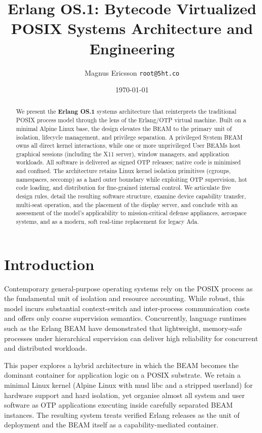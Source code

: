 \documentclass{article}
\title{Erlang OS.1: Bytecode Virtualized POSIX Systems Architecture and Engineering}
\author{Magnus Ericsson \texttt{root@5ht.co}}
\date{\today}
\begin{document}
\maketitle

\begin{abstract}
We present the \textbf{Erlang OS.1} systems architecture that reinterprets the traditional POSIX process model through the lens of the Erlang/OTP virtual machine.
Built on a minimal Alpine Linux base, the design elevates the BEAM to the primary unit of isolation, lifecycle management, and privilege separation.
A privileged System BEAM owns all direct kernel interactions, while one or more unprivileged User BEAMs host graphical sessions (including the X11 server), window managers, and application workloads.
All software is delivered as signed OTP releases; native code is minimised and confined.
The architecture retains Linux kernel isolation primitives (cgroups, namespaces, seccomp) as a hard outer boundary while exploiting OTP supervision, hot code loading, and distribution for fine-grained internal control.
We articulate five design rules, detail the resulting software structure, examine device capability transfer,
multi-seat operation, and the placement of the display server, and conclude with an assessment of the model's
applicability to mission-critical defense appliances, aerospace systems, and as a modern, soft real-time replacement for legacy Ada.
\end{abstract}

\newpage
\tableofcontents
\newpage

\section{Introduction}

Contemporary general-purpose operating systems rely on the POSIX process as the fundamental unit of isolation and resource accounting.
While robust, this model incurs substantial context-switch and inter-process communication costs and offers only coarse supervision semantics.
Concurrently, language runtimes such as the Erlang BEAM have demonstrated that lightweight, memory-safe processes under hierarchical supervision can deliver high reliability for concurrent and distributed workloads.

This paper explores a hybrid architecture in which the BEAM becomes the dominant container for application logic on a POSIX substrate.
We retain a minimal Linux kernel (Alpine Linux with musl libc and a stripped userland) for hardware support and hard isolation, yet organise almost all system and user software as OTP applications executing inside carefully separated BEAM instances.
The resulting system treats verified Erlang releases as the unit of deployment and the BEAM itself as a capability-mediated container.
\end{document}
